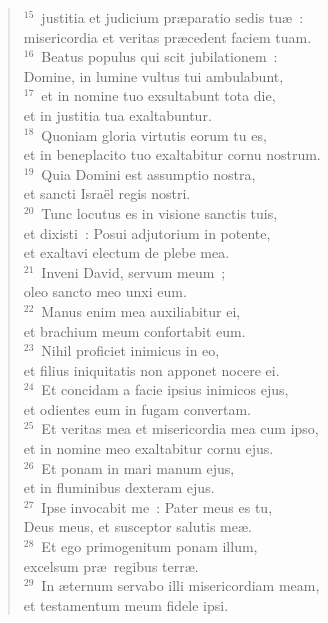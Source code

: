 \begin{flushleft}
\begin{verse}
${}^{15}$~justitia et judicium pr\ae paratio sedis tu\ae~:\\ misericordia et veritas pr\ae cedent faciem tuam.\\
${}^{16}$~Beatus populus qui scit jubilationem~:\\ Domine, in lumine vultus tui ambulabunt,\\
${}^{17}$~et in nomine tuo exsultabunt tota die,\\ et in justitia tua exaltabuntur.\\
${}^{18}$~Quoniam gloria virtutis eorum tu es,\\ et in beneplacito tuo exaltabitur cornu nostrum.\\
${}^{19}$~Quia Domini est assumptio nostra,\\ et sancti Isra\"el regis nostri.\\
${}^{20}$~Tunc locutus es in visione sanctis tuis,\\ et dixisti~: Posui adjutorium in potente,\\ et exaltavi electum de plebe mea.\\
${}^{21}$~Inveni David, servum meum~;\\ oleo sancto meo unxi eum.\\
${}^{22}$~Manus enim mea auxiliabitur ei,\\ et brachium meum confortabit eum.\\
${}^{23}$~Nihil proficiet inimicus in eo,\\ et filius iniquitatis non apponet nocere ei.\\
${}^{24}$~Et concidam a facie ipsius inimicos ejus,\\ et odientes eum in fugam convertam.\\
${}^{25}$~Et veritas mea et misericordia mea cum ipso,\\ et in nomine meo exaltabitur cornu ejus.\\
${}^{26}$~Et ponam in mari manum ejus,\\ et in fluminibus dexteram ejus.\\
${}^{27}$~Ipse invocabit me~: Pater meus es tu,\\ Deus meus, et susceptor salutis me\ae .\\
${}^{28}$~Et ego primogenitum ponam illum,\\ excelsum pr\ae\ regibus terr\ae .\\
${}^{29}$~In \ae ternum servabo illi misericordiam meam,\\ et testamentum meum fidele ipsi.\\

\end{verse}
\end{flushleft}
